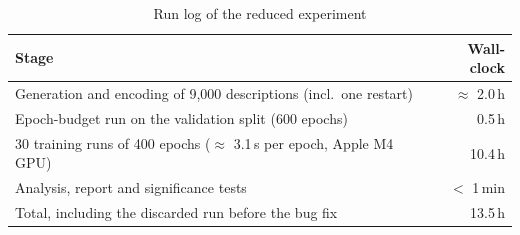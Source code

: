\documentclass[a4paper,11pt]{article}
\begin{document}
\begin{table}[H]
\centering
\small
\begin{tabular}{lr}
\toprule
Stage & Wall-clock \\
\midrule
Generation and encoding of 9,000 descriptions (incl.\ one restart) & $\approx$ 2.0\,h \\
Epoch-budget run on the validation split (600 epochs) & 0.5\,h \\
30 training runs of 400 epochs ($\approx$ 3.1\,s per epoch, Apple M4 GPU) & 10.4\,h \\
Analysis, report and significance tests & $<$ 1\,min \\
\midrule
Total, including the discarded run before the bug fix & 13.5\,h \\
\bottomrule
\end{tabular}
\caption{Run log of the reduced experiment}
\label{tab:runlog}
\end{table}
\end{document}
